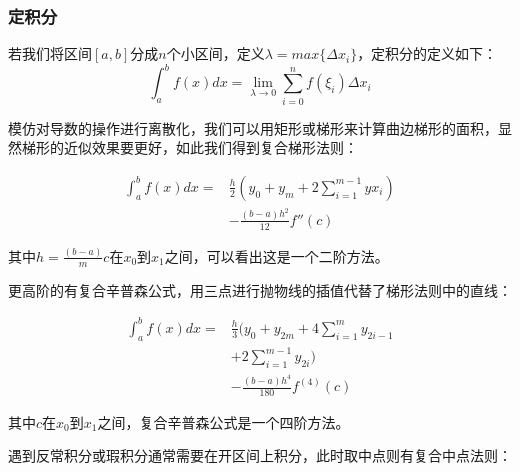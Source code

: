 \documentclass[UTF8,a4paper,10pt]{ctexart}
\begin{document}
\begin{multicols}{2}
            \subsubsection{定积分}
            若我们将区间$[a,b]$分成$n$个小区间，定义$\lambda = max\{\Delta x_i\}$，定积分的定义如下：
            \begin{equation}
                \int_{a}^{b}f(x)dx = \lim_{\lambda\to 0}\sum_{i=0}^{n}f(\xi_i)\Delta x_i
            \end{equation}\par
            模仿对导数的操作进行离散化，我们可以用矩形或梯形来计算曲边梯形的面积，显然梯形的近似效果要更好，如此我们得到复合梯形法则：
            \begin{footnotesize}
                \begin{equation}
                    \begin{split}
                        \int_a^b f(x)dx = &\frac{h}{2}(y_0+y_m+2\sum_{i=1}^{m-1}yx_i)\\
                        &-\frac{(b-a)h^2}{12}f''(c)
                    \end{split}
                \end{equation}
            \end{footnotesize}
            其中$h = \frac{(b-a)}{m}$$c$在$x_0$到$x_1$之间，可以看出这是一个二阶方法。\par
            更高阶的有复合辛普森公式，用三点进行抛物线的插值代替了梯形法则中的直线：
            \begin{footnotesize}
                \begin{equation}
                    \begin{split}
                        \int_a^b f(x)dx = &\frac{h}{3}(y_0+y_{2m}+4\sum_{i=1}^{m}y_{2i-1}\\
                        &+2\sum_{i=1}^{m-1}y_{2i})\\
                        &-\frac{(b-a)h^4}{180}f^{(4)}(c)
                    \end{split}
                \end{equation}
            \end{footnotesize}
            其中$c$在$x_0$到$x_1$之间，复合辛普森公式是一个四阶方法。\par
            遇到反常积分或瑕积分通常需要在开区间上积分，此时取中点则有复合中点法则：
            \begin{footnotesize}
                \begin{equation}
                    \begin{split}

\end{split}
\end{equation}
\end{footnotesize}$$
\end{multicols}
\end{document}

